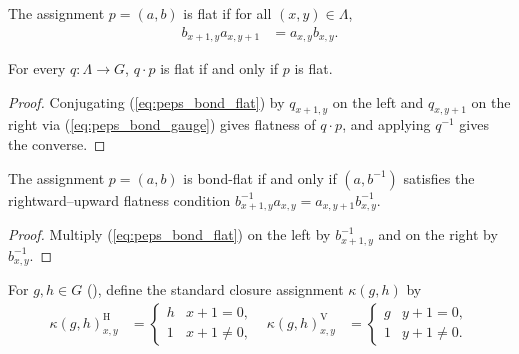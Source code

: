 \begin{definition}%
    \label{def:peps_bond_flat}
    \leanok
    The assignment $p=(a,b)$ is flat if for all $(x,y)\in\Lambda$,
    \begin{align}
        b_{x+1,y}a_{x,y+1} & =a_{x,y}b_{x,y}.
        \label{eq:peps_bond_flat}
    \end{align}
\end{definition}

\begin{lemma}%
    \label{thm:peps_bond_flat_gauge}
    \leanok
    For every $q:\Lambda\to G$, $q\cdot p$ is flat if and only if $p$ is flat.
\end{lemma}
\begin{proof}\leanok
    Conjugating (\ref{eq:peps_bond_flat}) by $q_{x+1,y}$ on the left and $q_{x,y+1}$ on the right via (\ref{eq:peps_bond_gauge}) gives flatness of $q\cdot p$, and applying $q^{-1}$ gives the converse.
\end{proof}

\begin{lemma}%
    \label{thm:peps_bond_flat_transport}
    \leanok
    The assignment $p=(a,b)$ is bond-flat if and only if $(a,b^{-1})$ satisfies the rightward--upward flatness condition $b_{x+1,y}^{-1}a_{x,y}=a_{x,y+1}b_{x,y}^{-1}$.
\end{lemma}
\begin{proof}\leanok
    Multiply (\ref{eq:peps_bond_flat}) on the left by $b_{x+1,y}^{-1}$ and on the right by $b_{x,y}^{-1}$.
\end{proof}

\begin{definition}%
    \label{def:peps_bond_closure}
    \leanok
    For $g,h\in G$ (\cite[Theorem~5.5 and Definition~5.6]{Schuch2010PEPS}), define the standard closure assignment $\kappa(g,h)$ by
    \begin{align}
        \kappa(g,h)^{\mathrm H}_{x,y}
         & =\begin{cases}h&x+1=0,\\1&x+1\ne0,\end{cases} &
        \kappa(g,h)^{\mathrm V}_{x,y}
         & =\begin{cases}g&y+1=0,\\1&y+1\ne0.\end{cases}
        \label{eq:peps_bond_closure}
    \end{align}
\end{definition}

